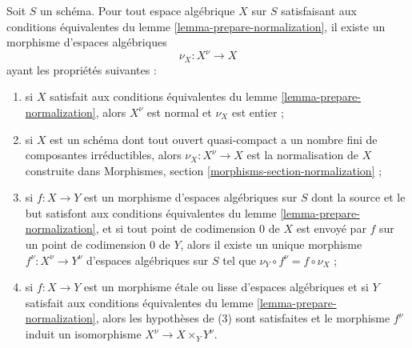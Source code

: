 \begin{lemma}
\label{lemma-normalization}
Soit $S$ un schéma. Pour tout espace algébrique $X$ sur $S$ satisfaisant
aux conditions équivalentes du lemme \ref{lemma-prepare-normalization},
il existe un morphisme d'espaces algébriques
$$
\nu_X : X^\nu \longrightarrow X
$$
ayant les propriétés suivantes :
\begin{enumerate}
\item si $X$ satisfait aux conditions équivalentes du
lemme \ref{lemma-prepare-normalization}, alors
$X^\nu$ est normal et $\nu_X$ est entier ;
\item si $X$ est un schéma dont tout ouvert quasi-compact a un nombre fini
de composantes irréductibles, alors $\nu_X : X^\nu \to X$ est la
normalisation de $X$ construite dans
Morphismes, section \ref{morphisms-section-normalization} ;
\item si $f : X \to Y$ est un morphisme d'espaces algébriques sur $S$
dont la source et le but satisfont aux conditions équivalentes du
lemme \ref{lemma-prepare-normalization}, et si tout point de codimension $0$
de $X$ est envoyé par $f$ sur un point de codimension $0$ de $Y$, alors
il existe un unique morphisme $f^\nu : X^\nu \to Y^\nu$ d'espaces
algébriques sur $S$ tel que $\nu_Y \circ f^\nu = f \circ \nu_X$ ;
\item si $f : X \to Y$ est un morphisme étale ou lisse d'espaces
algébriques et si $Y$ satisfait aux conditions équivalentes du
lemme \ref{lemma-prepare-normalization}, alors les hypothèses de (3)
sont satisfaites et le morphisme $f^\nu$ induit un isomorphisme
$X^\nu  \to X \times_Y Y^\nu$.
\end{enumerate}
\end{lemma}

